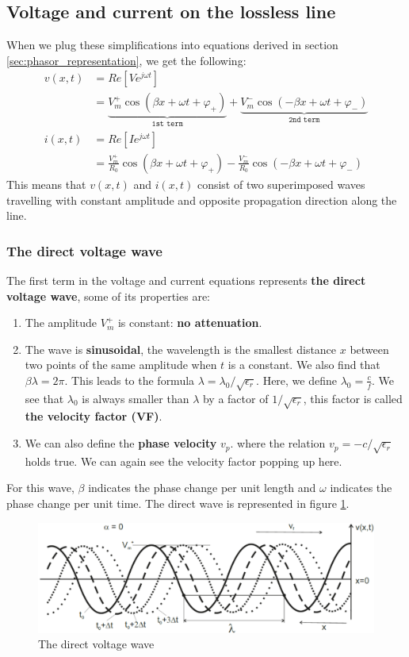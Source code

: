\documentclass[../transmission.tex]{subfiles}
\begin{document}
		\subsection{Voltage and current on the lossless line}
			When we plug these simplifications into equations derived in section \ref{sec:phasor_representation}, we get the following:
			\begin{align}
				v(x,t)&=Re[Ve^{j\omega t}]\\
				&=\underbrace{V^+_m\cos(\beta x+\omega t +\varphi_+)}_{\texttt{1st term}}+\underbrace{V_m^-\cos(-\beta x+\omega t+\varphi_-)}_{\texttt{2nd term}}\\
				i(x,t)&=Re[Ie^{j\omega t}]\\
				&=\frac{V^+_m}{R_0}\cos(\beta x+\omega t +\varphi_+)-\frac{V_m^-}{R_0}\cos(-\beta x+\omega t+\varphi_-)
			\end{align}
			This means that $v(x,t)$ and $i(x,t)$ consist of two superimposed waves travelling with constant amplitude and opposite propagation direction along the line.
			
			\subsubsection{The direct voltage wave}
				The first term in the voltage and current equations represents \textbf{the direct voltage wave}, some of its properties are:
				\begin{enumerate}
					\item The amplitude $V^+_m$ is constant: \textbf{no attenuation}.
					\item The wave is \textbf{sinusoidal}, the wavelength is the smallest distance $x$ between two points of the same amplitude when $t$ is a constant. We also find that $\beta\lambda = 2\pi$. This leads to the formula $\lambda =\lambda_0/\sqrt{\epsilon_r}$. Here, we define $\lambda_0 = \frac{c}{f}$. We see that $\lambda_0$ is always smaller than $\lambda$ by a factor of $1/\sqrt{\epsilon_r}$, this factor is called \textbf{the velocity factor (VF)}.
					\item We can also define the \textbf{phase velocity} $v_p$.  where the relation $v_p=-c/\sqrt{\epsilon_r}$ holds true. We can again see the velocity factor popping up here.
				\end{enumerate}
				For this wave, $\beta$ indicates the phase change per unit length and $\omega$ indicates the phase change per unit time. The direct wave is represented in figure \ref{fig:chap02losslessdirectwave}.
				
				\begin{figure}[h]
					\centering
					\includegraphics[width=\linewidth]{../assets/chap02_lossless_direct_wave.png}
					\caption[The direct voltage wave]{The direct voltage wave}
					\label{fig:chap02losslessdirectwave}
				\end{figure}
				
				
\end{document}
